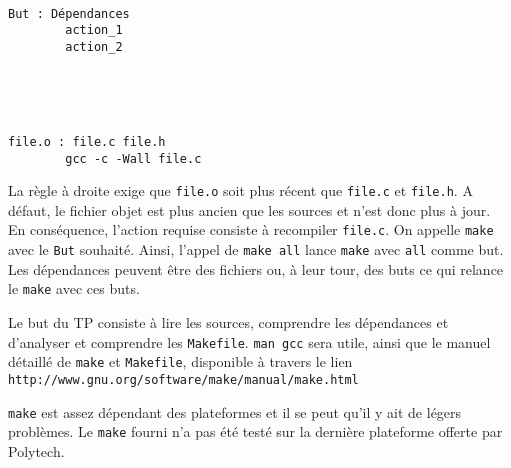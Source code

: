 \documentclass[12pt]{article} %
\begin{document}
\begin{sloppypar}
\begin{minipage}{.4\textwidth}
{\tt
\begin{verbatim} 
But : Dépendances
        action_1
        action_2
\end{verbatim}
}
\end{minipage}
\
\begin{minipage}{.4\textwidth}
{\tt
\begin{verbatim} 
file.o : file.c file.h
        gcc -c -Wall file.c
\end{verbatim}
}
\end{minipage}

\vspace*{2ex}
\noindent
La règle à droite exige que {\tt file.o} soit plus récent que {\tt file.c} et {\tt file.h}. A défaut, le fichier objet est plus ancien que les sources et n'est donc plus à jour. En conséquence, l'action requise consiste à recompiler {\tt file.c}. On appelle {\tt make} avec le {\tt But} souhaité. Ainsi, l'appel de {\tt make all} lance {\tt make} avec {\tt all} comme but. Les dépendances peuvent être des fichiers ou, à leur tour, des buts ce qui relance le {\tt make} avec ces buts.\medskip

\noindent
Le but du TP consiste à lire les sources, comprendre les dépendances et d'analyser et comprendre les {\tt Makefile}. {\tt man gcc} sera utile, ainsi que le manuel détaillé de {\tt make} et {\tt Makefile}, disponible à travers le lien  {\tt http://www.gnu.org/software/make/manual/make.html}\medskip

\noindent
{\tt make} est assez dépendant des plateformes et il se peut qu'il y ait de légers problèmes. Le {\tt make} fourni n'a pas été testé sur la dernière plateforme offerte par Polytech.


\end{sloppypar}
\end{document}
